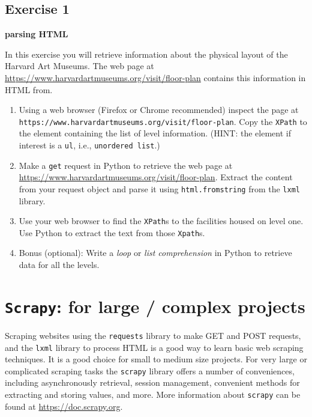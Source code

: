 \documentclass[]{book}
\providecommand{\tightlist}{%
  \setlength{\itemsep}{0pt}\setlength{\parskip}{0pt}}
\begin{document}
\hypertarget{exercise-1-5}{%
\subsection{Exercise 1}\label{exercise-1-5}}

\textbf{parsing HTML}

In this exercise you will retrieve information about the physical
layout of the Harvard Art Museums. The web page at
\url{https://www.harvardartmuseums.org/visit/floor-plan} contains this
information in HTML from.

\begin{enumerate}
\def\labelenumi{\arabic{enumi}.}
\tightlist
\item
  Using a web browser (Firefox or Chrome recommended) inspect the
  page at \texttt{https://www.harvardartmuseums.org/visit/floor-plan}. Copy
  the \texttt{XPath} to the element containing the list of level
  information. (HINT: the element if interest is a \texttt{ul}, i.e.,
  \texttt{unordered\ list}.)
\item
  Make a \texttt{get} request in Python to retrieve the web page at
  \url{https://www.harvardartmuseums.org/visit/floor-plan}. Extract the
  content from your request object and parse it using \texttt{html.fromstring}
  from the \texttt{lxml} library.
\item
  Use your web browser to find the \texttt{XPath}s to the facilities housed on
  level one. Use Python to extract the text from those \texttt{Xpath}s.
\item
  Bonus (optional): Write a \emph{loop} or \emph{list comprehension} in Python
  to retrieve data for all the levels.
\end{enumerate}

\hypertarget{scrapy-for-large-complex-projects}{%
\section{\texorpdfstring{\texttt{Scrapy}: for large / complex projects}{Scrapy: for large / complex projects}}\label{scrapy-for-large-complex-projects}}

Scraping websites using the \texttt{requests} library to make GET and POST
requests, and the \texttt{lxml} library to process HTML is a good way to
learn basic web scraping techniques. It is a good choice for small to
medium size projects. For very large or complicated scraping tasks the
\texttt{scrapy} library offers a number of conveniences, including
asynchronously retrieval, session management, convenient methods for
extracting and storing values, and more. More information about
\texttt{scrapy} can be found at \url{https://doc.scrapy.org}.
\end{document}
